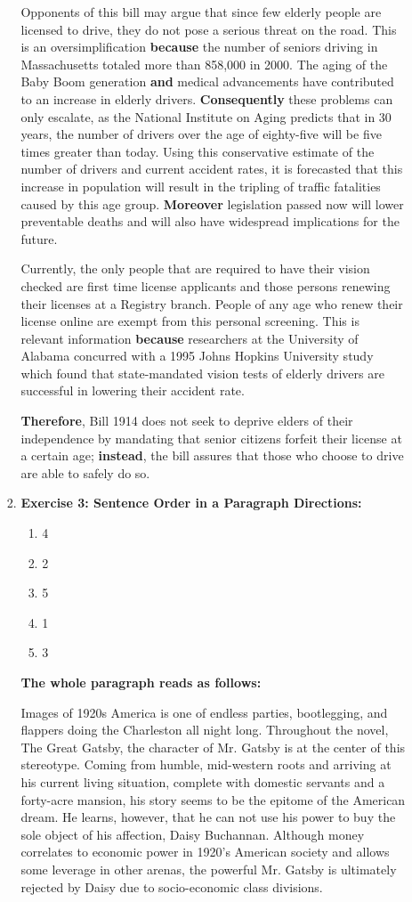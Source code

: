 \begin{enumerate}
\begin{itemize}
\begin{enumerate}
Opponents of this bill may argue that since few elderly people are licensed to drive, they do not pose a serious threat on the road. This is an oversimplification \textbf{because} the number of seniors driving in Massachusetts totaled more than 858,000 in 2000. The aging of the Baby Boom generation \textbf{and} medical advancements have contributed to an increase in elderly drivers. \textbf{Consequently} these problems can only escalate, as the National Institute on Aging predicts that in 30 years, the number of drivers over the age of eighty-five will be five times greater than today. Using this conservative estimate of the number of drivers and current accident rates, it is forecasted that this increase in population will result in the tripling of traffic fatalities caused by this age group. \textbf{Moreover} legislation passed now will lower preventable deaths and will also have widespread implications for the future. 
 
Currently, the only people that are required to have their vision checked are first time license applicants and those persons renewing their licenses at a Registry branch. People of any age who renew their license online are exempt from this personal screening. This is relevant information \textbf{because} researchers at the University of Alabama concurred with a 1995 Johns Hopkins University study which found that state-mandated vision tests of elderly drivers are successful in lowering their accident rate.

\textbf{Therefore}, Bill 1914 does not seek to deprive elders of their independence by mandating that senior citizens forfeit their license at a certain age; \textbf{instead}, the bill assures that those who choose to drive are able to safely do so.   

\item \textbf{Exercise 3: Sentence Order in a Paragraph Directions:}

\begin{enumerate}
\item 4
\item 2
\item 5
\item 1
\item 3
\end{enumerate}

\textbf{The whole paragraph reads as follows:}

Images of 1920s America is one of endless parties, bootlegging, and flappers doing the Charleston all night long. Throughout the novel, The Great Gatsby, the character of Mr. Gatsby is at the center of this stereotype. Coming from humble, mid-western roots and arriving at his current living situation, complete with domestic servants and a forty-acre mansion, his story seems to be the epitome of the American dream. He learns, however, that he can not use his power to buy the sole object of his affection, Daisy Buchannan. Although money correlates to economic power in 1920's American society and allows some leverage in other arenas, the powerful Mr. Gatsby is ultimately rejected by Daisy due to socio-economic class divisions.


\end{enumerate}
\end{itemize}
\end{enumerate}
